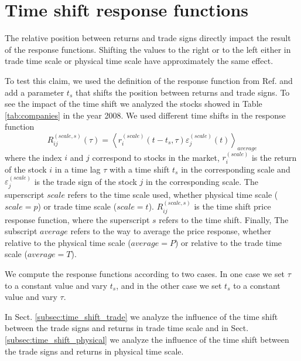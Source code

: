 \section{Time shift response functions}\label{sec:time_shift}

The relative position between returns and trade signs directly impact the
result of the response functions. Shifting the values to the right or to the
left either in trade time scale or physical time scale have approximately the
same effect.

To test this claim, we used the definition of the response function from Ref.
\cite{Wang_2016_cross} and add a parameter $t_{s}$ that shifts the position
between returns and trade signs. To see the impact of the time shift we
analyzed the stocks showed in Table \ref{tab:companies} in the year 2008. We
used different time shifts in the response function
\begin{equation}\label{eq:time_shift_general}
    R_{ij}^{\left(scale, s\right)}\left(\tau\right)=\left\langle
    r^{\left(scale\right)}_{i} \left(t-t_{s},\tau\right)
    \varepsilon^{\left(scale\right)}_{j} \left(t\right)\right\rangle_{average}
\end{equation}
where the index $i$ and $j$ correspond to stocks in the market,
$r^{\left(scale\right)}_{i}$ is the return of the stock $i$ in a time lag
$\tau$ with a time shift $t_{s}$ in the corresponding scale and
$\varepsilon^{\left(scale\right)}_{j}$ is the trade sign of the stock $j$ in
the corresponding scale.  The superscript $scale$ refers to the time scale
used, whether physical time scale ($scale = p$) or trade time scale
($scale = t$). $R_{ij}^{\left(scale, s\right)}$ is the time shift price
response function, where the superscript $s$ refers to the time shift. Finally,
The subscript $average$ refers to the way to average the price response,
whether relative to the physical time scale ($average = P$) or relative to the
trade time scale ($average = T$).

We compute the response functions according to two cases. In one case we set
$\tau$ to a constant value and vary $t_{s}$, and in the other case we set
$t_{s}$ to a constant value and vary $\tau$.

In Sect. \ref{subsec:time_shift_trade} we analyze the influence of the time
shift between the trade signs and returns in trade time scale and in Sect.
\ref{subsec:time_shift_physical} we analyze the influence of the time shift
between the trade signs and returns in physical time scale.

